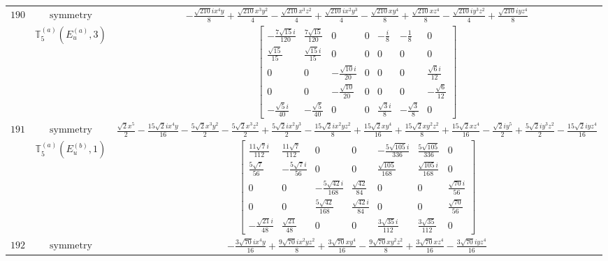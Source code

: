 \documentclass[fleqn,8pt,landscape]{jsarticle}
\begin{document}
\begin{longtable}{ccc}
$ 190 $ & $ \text{symmetry} $ & $ - \frac{\sqrt{210} i x^{4} y}{8} + \frac{\sqrt{210} x^{3} y^{2}}{4} - \frac{\sqrt{210} x^{3} z^{2}}{4} + \frac{\sqrt{210} i x^{2} y^{3}}{4} - \frac{\sqrt{210} x y^{4}}{8} + \frac{\sqrt{210} x z^{4}}{8} - \frac{\sqrt{210} i y^{3} z^{2}}{4} + \frac{\sqrt{210} i y z^{4}}{8} $ \\
$  $ & $ \mathbb{T}_{5}^{(a)}(E_{u}^{(a)},3) $ & $ \begin{bmatrix} - \frac{7 \sqrt{15} i}{120} & \frac{7 \sqrt{15}}{120} & 0 & 0 & - \frac{i}{8} & - \frac{1}{8} & 0 \\ \frac{\sqrt{15}}{15} & \frac{\sqrt{15} i}{15} & 0 & 0 & 0 & 0 & 0 \\ 0 & 0 & - \frac{\sqrt{10} i}{20} & 0 & 0 & 0 & \frac{\sqrt{6} i}{12} \\ 0 & 0 & - \frac{\sqrt{10}}{20} & 0 & 0 & 0 & - \frac{\sqrt{6}}{12} \\ - \frac{\sqrt{5} i}{40} & - \frac{\sqrt{5}}{40} & 0 & 0 & \frac{\sqrt{3} i}{8} & - \frac{\sqrt{3}}{8} & 0 \end{bmatrix} $ \\ \hline
$ 191 $ & $ \text{symmetry} $ & $ \frac{\sqrt{2} x^{5}}{2} - \frac{15 \sqrt{2} i x^{4} y}{16} - \frac{5 \sqrt{2} x^{3} y^{2}}{2} - \frac{5 \sqrt{2} x^{3} z^{2}}{2} + \frac{5 \sqrt{2} i x^{2} y^{3}}{2} - \frac{15 \sqrt{2} i x^{2} y z^{2}}{8} + \frac{15 \sqrt{2} x y^{4}}{16} + \frac{15 \sqrt{2} x y^{2} z^{2}}{8} + \frac{15 \sqrt{2} x z^{4}}{16} - \frac{\sqrt{2} i y^{5}}{2} + \frac{5 \sqrt{2} i y^{3} z^{2}}{2} - \frac{15 \sqrt{2} i y z^{4}}{16} $ \\
$  $ & $ \mathbb{T}_{5}^{(a)}(E_{u}^{(b)},1) $ & $ \begin{bmatrix} \frac{11 \sqrt{7} i}{112} & \frac{11 \sqrt{7}}{112} & 0 & 0 & - \frac{5 \sqrt{105} i}{336} & \frac{5 \sqrt{105}}{336} & 0 \\ \frac{5 \sqrt{7}}{56} & - \frac{5 \sqrt{7} i}{56} & 0 & 0 & \frac{\sqrt{105}}{168} & \frac{\sqrt{105} i}{168} & 0 \\ 0 & 0 & - \frac{5 \sqrt{42} i}{168} & \frac{\sqrt{42}}{84} & 0 & 0 & \frac{\sqrt{70} i}{56} \\ 0 & 0 & \frac{5 \sqrt{42}}{168} & \frac{\sqrt{42} i}{84} & 0 & 0 & \frac{\sqrt{70}}{56} \\ - \frac{\sqrt{21} i}{48} & \frac{\sqrt{21}}{48} & 0 & 0 & \frac{3 \sqrt{35} i}{112} & \frac{3 \sqrt{35}}{112} & 0 \end{bmatrix} $ \\ \hline
$ 192 $ & $ \text{symmetry} $ & $ - \frac{3 \sqrt{70} i x^{4} y}{16} + \frac{9 \sqrt{70} i x^{2} y z^{2}}{8} + \frac{3 \sqrt{70} x y^{4}}{16} - \frac{9 \sqrt{70} x y^{2} z^{2}}{8} + \frac{3 \sqrt{70} x z^{4}}{16} - \frac{3 \sqrt{70} i y z^{4}}{16} $ \\

\end{longtable}
\end{document}
